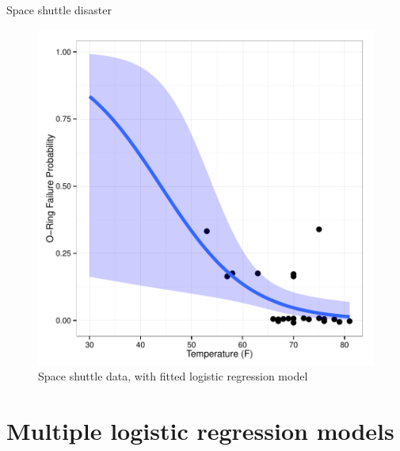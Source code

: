 \documentclass[11pt]{book}
\begin{document}
\begin{Example}{Space shuttle disaster}
\begin{figure}
\centering
\includegraphics[width=.7\textwidth]{ch07/fig/nasa-temp-ggplot}
\caption{Space shuttle data, with fitted logistic regression model}
\label{fig:nasa-temp-ggplot}
\end{figure}

\end{Example}



\section{Multiple logistic regression models}\label{sec:logist-mult}
\end{document}
